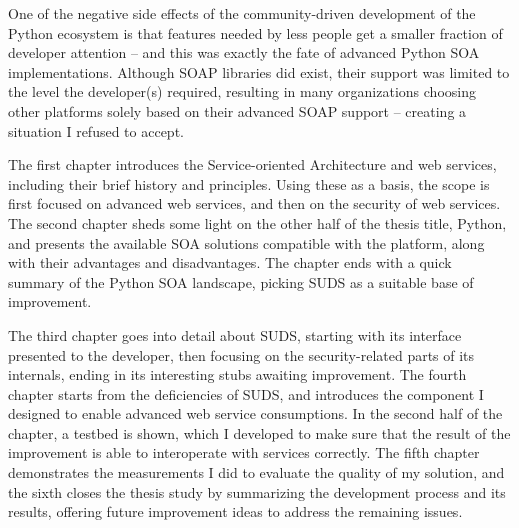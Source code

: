One of the negative side effects of the community-driven development of the Python ecosystem is that features needed by less people get a smaller fraction of developer attention -- and this was exactly the fate of advanced Python SOA implementations. Although SOAP libraries did exist, their support was limited to the level the developer(s) required, resulting in many organizations choosing other platforms solely based on their advanced SOAP support -- creating a situation I refused to accept.

The first chapter introduces the Service-oriented Architecture and web services, including their brief history and principles. Using these as a basis, the scope is first focused on advanced web services, and then on the security of web services. The second chapter sheds some light on the other half of the thesis title, Python, and presents the available SOA solutions compatible with the platform, along with their advantages and disadvantages. The chapter ends with a quick summary of the Python SOA landscape, picking SUDS as a suitable base of improvement.

The third chapter goes into detail about SUDS, starting with its interface presented to the developer, then focusing on the security-related parts of its internals, ending in its interesting stubs awaiting improvement. The fourth chapter starts from the deficiencies of SUDS, and introduces the component I designed to enable advanced web service consumptions. In the second half of the chapter, a testbed is shown, which I developed to make sure that the result of the improvement is able to interoperate with services correctly. The fifth chapter demonstrates the measurements I did to evaluate the quality of my solution, and the sixth closes the thesis study by summarizing the development process and its results, offering future improvement ideas to address the remaining issues.
